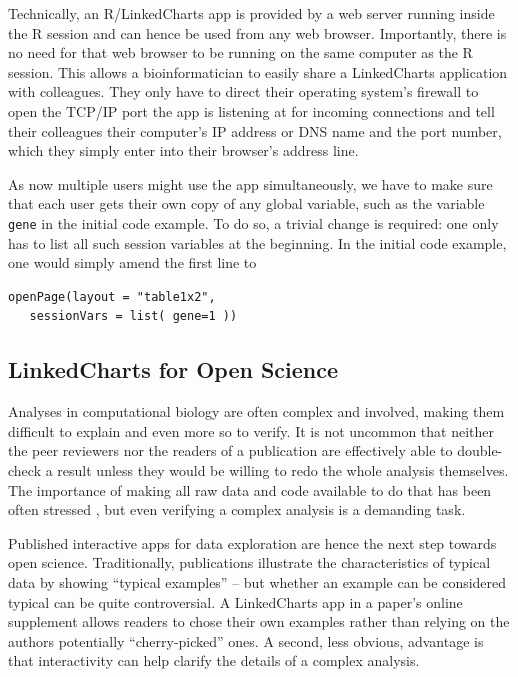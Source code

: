 \documentclass[twocolumn,10pt]{article}
\begin{document}
Technically, an R/LinkedCharts app is provided by a web server running inside the R session and can hence be used from any web browser. Importantly, there is no need for that web browser to be running on the same computer as the R session. This allows a bioinformatician to easily share a LinkedCharts application with colleagues. They only have to direct their operating system's firewall to open the TCP/IP port the app is listening at for incoming connections and tell their colleagues their computer's IP address or DNS name and the port number, which they simply enter into their browser's address line.

As now multiple users might use the app simultaneously, we have to make sure that each user gets their own copy of any global variable, such as the variable \texttt{gene} in the initial code example. To do so, a trivial change is required: one only has to list all such session variables at the beginning. In the initial code example, one would simply amend the first line to 
\begin{verbatim}
openPage(layout = "table1x2", 
   sessionVars = list( gene=1 ))
\end{verbatim}


\subsection{LinkedCharts for Open Science}

Analyses in computational biology are often complex and involved, making them difficult to explain and even more so to verify. It is not uncommon that neither the peer reviewers nor the readers of a publication are effectively able to double-check a result unless they would be willing to redo the whole analysis themselves. The importance of making all raw data and code available to do that has been often stressed \citep{gentleman_2005}, but even verifying a complex analysis is a demanding task.

Published interactive apps for data exploration are hence the next step towards open science. Traditionally, publications illustrate the characteristics of typical data by showing ``typical examples'' -- but whether an example can be considered typical can be quite controversial. A LinkedCharts app in a paper's online supplement allows readers to chose their own examples rather than relying on the authors potentially ``cherry-picked'' ones. A second, less obvious, advantage is that interactivity can help clarify the details of a complex analysis.
\end{document}
